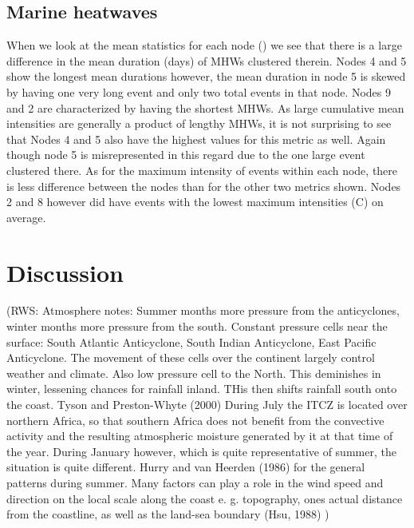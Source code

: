 \documentclass[a4paper,10pt,review]{elsarticle}
\begin{document}
\subsection{Marine heatwaves}
When we look at the mean statistics for each node () we see that there is a large difference in the mean duration (days) of MHWs clustered therein. Nodes 4 and 5 show the longest mean durations however, the mean duration in node 5 is skewed by having one very long event and only two total events in that node. Nodes 9 and 2 are characterized by having the shortest MHWs. As large cumulative mean intensities are generally a product of lengthy MHWs, it is not surprising to see that Nodes 4 and 5 also have the highest values for this metric as well. Again though node 5 is misrepresented in this regard due to the one large event clustered there. As for the maximum intensity of events within each node, there is less difference between the nodes than for the other two metrics shown. Nodes 2 and 8 however did have events with the lowest maximum intensities (\degree C) on average.

\section{Discussion}


(RWS: Atmosphere notes:
Summer months more pressure from the anticyclones, winter months more pressure from the south.
Constant pressure cells near the surface: South Atlantic Anticyclone, South Indian Anticyclone, East Pacific Anticyclone.
The movement of these cells over the continent largely control weather and climate.
Also low pressure cell to the North. This deminishes in winter, lessening chances for rainfall inland. THis then shifts rainfall south onto the coast. Tyson and Preston-Whyte (2000)
During July the ITCZ is located over northern Africa, so that southern Africa does not benefit from the convective activity and the resulting atmospheric moisture generated by it at that time of the year. During January however, which is quite representative of summer, the situation is quite different.
Hurry and van Heerden (1986) for the general patterns during summer.
Many factors can play a role in the wind speed and direction on the local scale along the coast e. g. topography, ones actual distance from the coastline, as well as the land-sea boundary (Hsu, 1988)
)
\end{document}
